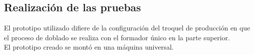 \subsection{Realización de las pruebas}

El prototipo utilizado difiere de la configuración del troquel de producción en que el proceso de 
doblado se realiza con el formador único en la parte superior.\\

El prototipo creado se montó en una máquina universal.

